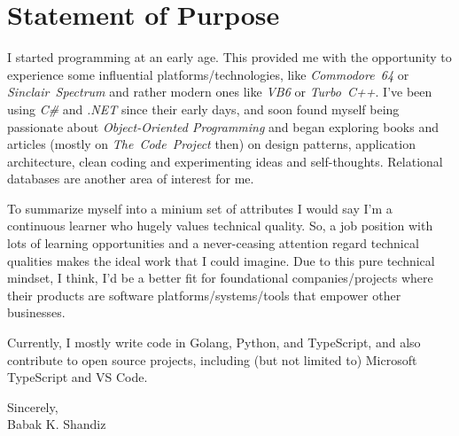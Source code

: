 \documentclass[9pt,a4paper]{extarticle}
\begin{document}


\section*{Statement of Purpose}

I started programming at an early age. This provided me with the opportunity
to experience some influential platforms/technologies, like
\textit{Commodore~64} or \textit{Sinclair~Spectrum} and rather modern ones
like \textit{VB6} or \textit{Turbo~C++}. I've been using \textit{C\#} and
\textit{.NET} since their early days, and soon found myself being passionate
about \textit{Object-Oriented Programming} and began exploring books and
articles (mostly on \textit{The~Code~Project} then) on design patterns,
application architecture, clean coding and experimenting ideas and
self-thoughts. Relational databases are another area of interest for me.

To summarize myself into a minium set of attributes I would say I'm a
continuous learner who hugely values technical quality. So, a job position with
lots of learning opportunities and a never-ceasing attention regard technical
qualities makes the ideal work that I could imagine. Due to this pure technical
mindset, I think, I'd be a better fit for foundational companies/projects where
their products are software platforms/systems/tools that empower other
businesses.

Currently, I mostly write code in Golang, Python, and TypeScript, and also
contribute to open source projects, including (but not limited to) Microsoft
TypeScript and VS Code.

\vspace{2em}
\noindent
Sincerely, \\
\noindent
Babak K. Shandiz
\end{document}
